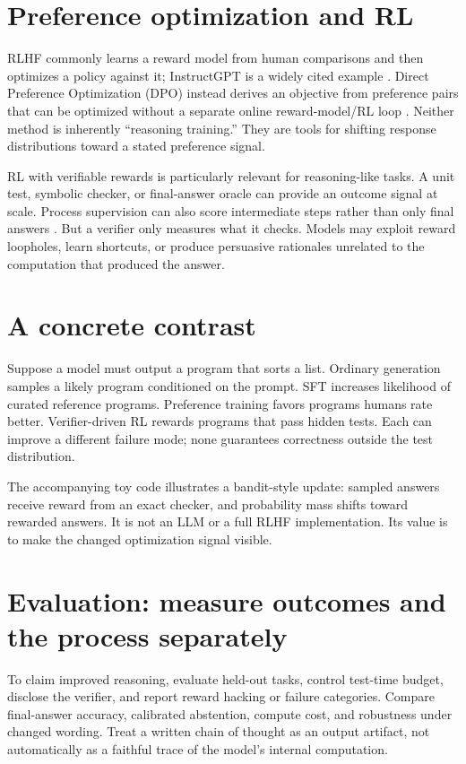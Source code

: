 \documentclass[11pt]{article}
\begin{document}
\section{Preference optimization and RL}
RLHF commonly learns a reward model from human comparisons and then optimizes a policy against it; InstructGPT is a widely cited example \cite{ouyang2022instructgpt}. Direct Preference Optimization (DPO) instead derives an objective from preference pairs that can be optimized without a separate online reward-model/RL loop \cite{rafailov2023dpo}. Neither method is inherently ``reasoning training.'' They are tools for shifting response distributions toward a stated preference signal.

RL with verifiable rewards is particularly relevant for reasoning-like tasks. A unit test, symbolic checker, or final-answer oracle can provide an outcome signal at scale. Process supervision can also score intermediate steps rather than only final answers \cite{lightman2023process}. But a verifier only measures what it checks. Models may exploit reward loopholes, learn shortcuts, or produce persuasive rationales unrelated to the computation that produced the answer.

\section{A concrete contrast}
Suppose a model must output a program that sorts a list. Ordinary generation samples a likely program conditioned on the prompt. SFT increases likelihood of curated reference programs. Preference training favors programs humans rate better. Verifier-driven RL rewards programs that pass hidden tests. Each can improve a different failure mode; none guarantees correctness outside the test distribution.

The accompanying toy code illustrates a bandit-style update: sampled answers receive reward from an exact checker, and probability mass shifts toward rewarded answers. It is not an LLM or a full RLHF implementation. Its value is to make the changed optimization signal visible.

\section{Evaluation: measure outcomes and the process separately}
To claim improved reasoning, evaluate held-out tasks, control test-time budget, disclose the verifier, and report reward hacking or failure categories. Compare final-answer accuracy, calibrated abstention, compute cost, and robustness under changed wording. Treat a written chain of thought as an output artifact, not automatically as a faithful trace of the model's internal computation.
\end{document}
